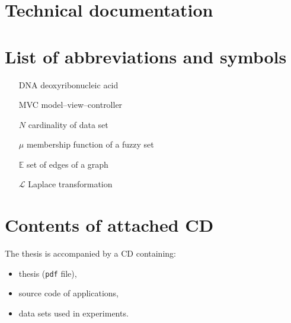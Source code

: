 \documentclass[a4paper,twoside,12pt]{book}
\begin{document}
\begin{appendices} 


\chapter*{Technical documentation}

\chapter*{List of abbreviations and symbols}

\begin{itemize}
\item[DNA] deoxyribonucleic acid
\item[MVC] model--view--controller 
\item[$N$] cardinality of data set
\item[$\mu$] membership function of a fuzzy set
\item[$\mathbb{E}$] set of edges of a graph
\item[$\mathcal{L}$] Laplace transformation
\end{itemize}


 

\chapter*{Contents of attached CD}

The thesis is accompanied by a CD containing:
\begin{itemize}
\item thesis (\texttt{pdf} file),
\item source code of applications,
\item data sets used in experiments.
\end{itemize}

\listoffigures
{}
\listoftables
{}
	
\end{appendices}
\end{document}
